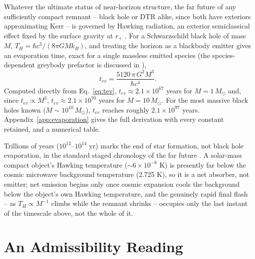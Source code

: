 \documentclass[11pt]{article}
\begin{document}
Whatever the ultimate status of near-horizon structure, the far future of any sufficiently compact remnant -- black hole or DTR alike, since both have exteriors approximating Kerr -- is governed by Hawking radiation, an exterior semiclassical effect fixed by the surface gravity at $r_+$ \cite{hawking1975}. For a Schwarzschild black hole of mass $M$, $T_H = \hbar c^3/(8\pi G M k_B)$, and treating the horizon as a blackbody emitter gives an evaporation time, exact for a single massless emitted species (the species-dependent greybody prefactor is discussed in \cite{page1976,page1976rotating,macgibbon1991}),
\begin{equation}
t_{ev} = \frac{5120\,\pi\, G^2 M^3}{\hbar c^4}.
\label{eq:tev}
\end{equation}
Computed directly from Eq.~\eqref{eq:tev}, $t_{ev} \approx 2.1\times10^{67}$ years for $M=1\,M_\odot$ and, since $t_{ev}\propto M^3$, $t_{ev}\approx 2.1\times10^{70}$ years for $M=10\,M_\odot$. For the most massive black holes known ($M\sim 10^{10}\,M_\odot$), $t_{ev}$ reaches roughly $2.1\times10^{97}$ years. Appendix~\ref{app:evaporation} gives the full derivation with every constant retained, and a numerical table.

Trillions of years ($10^{12}$--$10^{14}$ yr) marks the end of star formation, not black hole evaporation, in the standard staged chronology of the far future \cite{adamslaughlin1997}. A solar-mass compact object's Hawking temperature ($\sim6\times10^{-8}$ K) is presently far below the cosmic microwave background temperature (2.725 K), so it is a net absorber, not emitter; net emission begins only once cosmic expansion cools the background below the object's own Hawking temperature, and the genuinely rapid final flash -- as $T_H \propto M^{-1}$ climbs while the remnant shrinks -- occupies only the last instant of the timescale above, not the whole of it.

\section{An Admissibility Reading}
\end{document}

